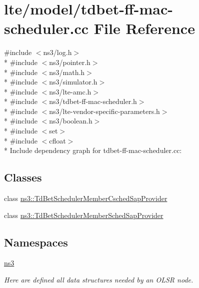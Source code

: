 \hypertarget{lte_2model_2tdbet-ff-mac-scheduler_8cc}{}\section{lte/model/tdbet-\/ff-\/mac-\/scheduler.cc File Reference}
\label{lte_2model_2tdbet-ff-mac-scheduler_8cc}
{\ttfamily \#include $<$ns3/log.\+h$>$}\\*
{\ttfamily \#include $<$ns3/pointer.\+h$>$}\\*
{\ttfamily \#include $<$ns3/math.\+h$>$}\\*
{\ttfamily \#include $<$ns3/simulator.\+h$>$}\\*
{\ttfamily \#include $<$ns3/lte-\/amc.\+h$>$}\\*
{\ttfamily \#include $<$ns3/tdbet-\/ff-\/mac-\/scheduler.\+h$>$}\\*
{\ttfamily \#include $<$ns3/lte-\/vendor-\/specific-\/parameters.\+h$>$}\\*
{\ttfamily \#include $<$ns3/boolean.\+h$>$}\\*
{\ttfamily \#include $<$set$>$}\\*
{\ttfamily \#include $<$cfloat$>$}\\*
Include dependency graph for tdbet-\/ff-\/mac-\/scheduler.cc\+:
\subsection*{Classes}
\begin{DoxyCompactItemize}
\item 
class \hyperlink{classns3_1_1TdBetSchedulerMemberCschedSapProvider}{ns3\+::\+Td\+Bet\+Scheduler\+Member\+Csched\+Sap\+Provider}
\item 
class \hyperlink{classns3_1_1TdBetSchedulerMemberSchedSapProvider}{ns3\+::\+Td\+Bet\+Scheduler\+Member\+Sched\+Sap\+Provider}
\end{DoxyCompactItemize}
\subsection*{Namespaces}
\begin{DoxyCompactItemize}
\item 
 \hyperlink{namespacens3}{ns3}
\begin{DoxyCompactList}\small\item\em Here are defined all data structures needed by an O\+L\+SR node. \end{DoxyCompactList}\end{DoxyCompactItemize}
